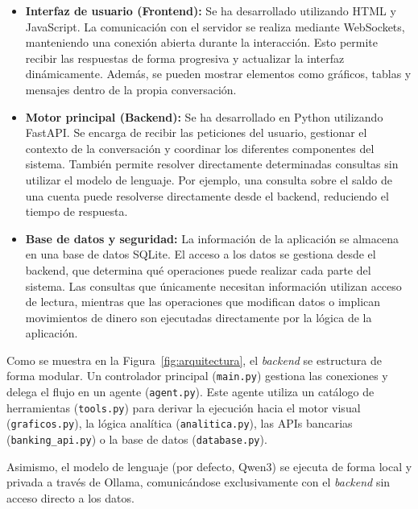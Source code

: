 \begin{itemize}

    \item \textbf{Interfaz de usuario (Frontend):} Se ha desarrollado utilizando
    HTML y JavaScript. La comunicación con
    el servidor se realiza mediante WebSockets, manteniendo una conexión abierta
    durante la interacción. Esto permite recibir las respuestas de forma
    progresiva y actualizar la interfaz dinámicamente. Además, se pueden mostrar
    elementos como gráficos, tablas y mensajes dentro de la propia conversación.

    \item \textbf{Motor principal (Backend):} Se ha desarrollado en Python
    utilizando FastAPI. Se encarga de recibir las peticiones del usuario, gestionar 
    el contexto de la conversación y coordinar los diferentes componentes del sistema. 
    También permite resolver directamente determinadas consultas sin utilizar el modelo de
    lenguaje. Por ejemplo, una consulta sobre el saldo de una cuenta puede
    resolverse directamente desde el backend, reduciendo el tiempo de respuesta.

    \item \textbf{Base de datos y seguridad:} La información de la aplicación
    se almacena en una base de datos SQLite. El acceso a los datos se gestiona
    desde el backend, que determina qué operaciones puede realizar cada parte
    del sistema. Las consultas que únicamente necesitan información utilizan
    acceso de lectura, mientras que las operaciones que modifican datos o
    implican movimientos de dinero son ejecutadas directamente por la lógica de
    la aplicación.

\end{itemize}

Como se muestra en la Figura~\ref{fig:arquitectura}, el 
\emph{backend} se estructura de forma modular. Un controlador 
principal (\texttt{main.py}) gestiona las conexiones y delega el 
flujo en un agente (\texttt{agent.py}). Este agente utiliza un 
catálogo de herramientas (\texttt{tools.py}) para derivar la 
ejecución hacia el motor visual (\texttt{graficos.py}), la 
lógica analítica (\texttt{analitica.py}), las APIs bancarias 
(\texttt{banking\_api.py}) o la base de datos 
(\texttt{database.py}). 

Asimismo, el modelo de lenguaje (por defecto, Qwen3) se ejecuta 
de forma local y privada a través de Ollama, comunicándose 
exclusivamente con el \emph{backend} sin acceso directo a los 
datos.

